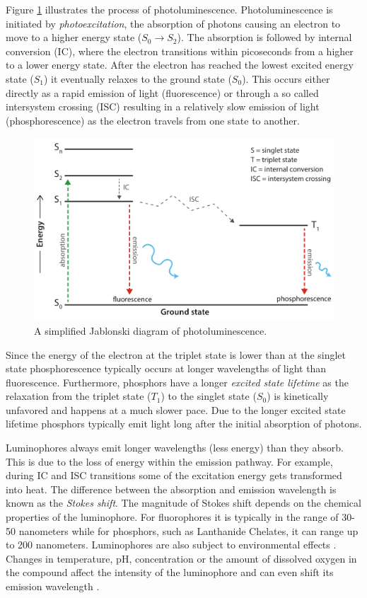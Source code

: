 \documentclass[thesis.tex]{subfiles}
\begin{document}
Figure \ref{figure:photoluminescence} illustrates the process of photoluminescence. Photoluminescence is initiated by \emph{photoexcitation}, the absorption of photons causing an electron to move to a higher energy state ($S_0 \rightarrow S_2$). The absorption is followed by internal conversion (IC), where the electron transitions within picoseconds from a higher to a lower energy state. After the electron has reached the lowest excited energy state ($S_1$) it eventually relaxes to the ground state ($S_0$). This occurs either directly as a rapid emission of light (fluorescence) or through a so called intersystem crossing (ISC) resulting in a relatively slow emission of light (phosphorescence) as the electron travels from one state to another.

\begin{figure}[hb]
\centering \includegraphics[width=\textwidth]{images/photoluminescence.pdf}
\caption{A simplified Jablonski diagram of photoluminescence. \label{figure:photoluminescence}}
\end{figure}

\noindent Since the energy of the electron at the triplet state is lower than at the singlet state phosphorescence typically occurs at longer wavelengths of light than fluorescence. Furthermore, phosphors have a longer \emph{excited state lifetime} as the relaxation from the triplet state ($T_1$) to the singlet state ($S_0$) is kinetically unfavored and happens at a much slower pace. Due to the longer excited state lifetime phosphors typically emit light long after the initial absorption of photons. \cite{CEJ}

Luminophores always emit longer wavelengths (less energy) than they absorb. This is due to the loss of energy within the emission pathway. For example, during IC and ISC transitions some of the excitation energy gets transformed into heat. The difference between the absorption and emission wavelength is known as the \emph{Stokes shift}. The magnitude of Stokes shift depends on the chemical properties of the luminophore. For fluorophores it is typically in the range of 30-50 nanometers while for phosphors, such as Lanthanide Chelates, it can range up to 200 nanometers. Luminophores are also subject to environmental effects \cite{hemmila}. Changes in temperature, pH, concentration or the amount of dissolved oxygen in the compound affect the intensity of the luminophore and can even shift its emission wavelength \cite{luminescence_basics}.
\end{document}
